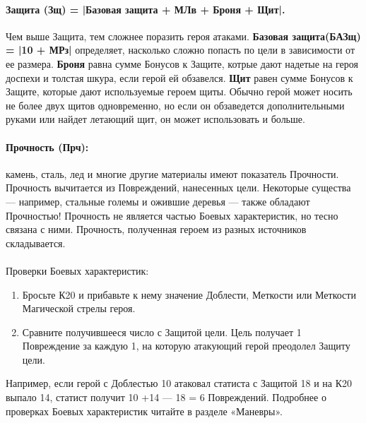 \paragraph{Защита (Зщ) = |Базовая защита + МЛв + Броня + Щит|.} Чем выше Защита, тем сложнее поразить героя атаками.
\newline \textbf{Базовая защита(БАЗщ) = |10 + МРз|} определяет, насколько сложно попасть по цели в зависимости от ее размера.
\newline \textbf{Броня} равна сумме Бонусов к Защите, котрые дают надетые на героя доспехи и толстая шкура, если герой ей обзавелся.
\newline \textbf{Щит} равен сумме Бонусов к Защите, которые дают используемые героем щиты. Обычно герой может носить не более двух щитов одновременно, но если он обзаведется дополнительными руками или найдет летающий щит, он может использовать и больше.
\paragraph{Прочность (Прч):} камень, сталь, лед и многие другие материалы имеют показатель Прочности. Прочность вычитается из Повреждений, нанесенных цели. Некоторые существа — например, стальные големы и ожившие деревья — также обладают Прочностью! Прочность не является частью Боевых характеристик, но тесно связана с ними.
\newline Прочность, полученная героем из разных источников складывается.
\paragraph{}Проверки Боевых характеристик:
\begin{enumerate}
\item Бросьте К20 и прибавьте к нему значение Доблести, Меткости или Меткости Магической стрелы героя.
\item Сравните получившееся число с Защитой цели. Цель получает 1 Повреждение за каждую 1, на которую атакующий герой преодолел Защиту цели.
\end{enumerate}
Например, если герой с Доблестью 10 атаковал статиста с Защитой 18 и на К20 выпало 14, статист получит 10 +14 — 18 = 6 Повреждений.
\newline
Подробнее о проверках Боевых характеристик читайте в разделе «Маневры».
